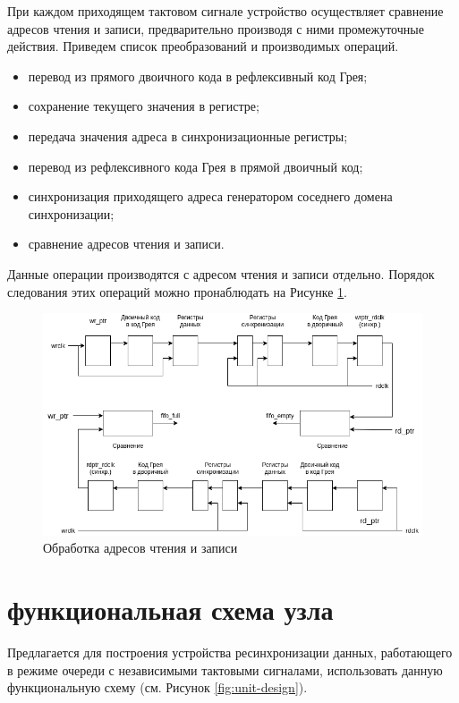 При каждом приходящем тактовом сигнале устройство осуществляет сравнение адресов чтения и записи, предварительно производя с ними промежуточные действия. Приведем список преобразований и производимых операций.

\begin{itemize}
	\item перевод из прямого двоичного кода в рефлексивный код Грея;
	\item сохранение текущего значения в регистре;
	\item передача значения адреса в синхронизационные регистры;
	\item перевод из рефлексивного кода Грея в прямой двоичный код;
	\item синхронизация приходящего адреса генератором соседнего домена синхронизации;
	\item сравнение адресов чтения и записи.
\end{itemize}

Данные операции производятся с адресом чтения и записи отдельно. Порядок следования этих операций можно пронаблюдать на Рисунке \ref{fig:signal-process}.

\begin{figure}
	\centering
	\includegraphics[width=0.7\linewidth]{course-scheme/images/signal-process}
	\caption{Обработка адресов чтения и записи}
	\label{fig:signal-process}
\end{figure}



\section{функциональная схема узла}
Предлагается для построения устройства ресинхронизации данных, работающего в режиме очереди с независимыми тактовыми сигналами, использовать данную функциональную схему (см. Рисунок \ref{fig:unit-design}).


